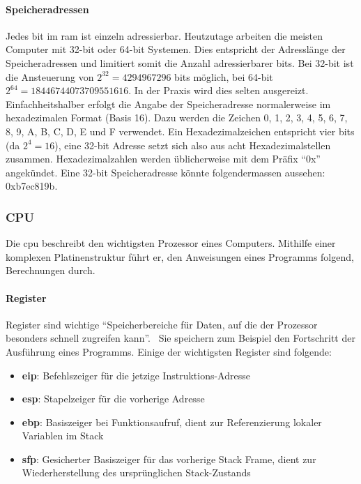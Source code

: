 \documentclass[11pt, a4paper]{article}
\begin{document}
\paragraph{Speicheradressen}
Jedes \gls{bit} im \gls{ram} ist einzeln adressierbar. Heutzutage arbeiten die meisten Computer mit 32-\gls{bit} oder 64-\gls{bit} Systemen. Dies entspricht der Adresslänge der Speicheradressen und limitiert somit die Anzahl adressierbarer \glspl{bit}. Bei 32-\gls{bit} ist die Ansteuerung von \(2^{32} = 4 294 967 296\) \glspl{bit} möglich, bei 64-\gls{bit} \(2^{64} = 18 446 744 073 709 551 616\). In der Praxis wird dies selten ausgereizt. Einfachheitshalber erfolgt die Angabe der Speicheradresse normalerweise im hexadezimalen Format (Basis 16). Dazu werden die Zeichen 0, 1, 2, 3, 4, 5, 6, 7, 8, 9, A, B, C, D, E und F verwendet. Ein Hexadezimalzeichen entspricht vier \glspl{bit} (da \(2^4 = 16\)), eine 32-\gls{bit} Adresse setzt sich also aus acht Hexadezimalstellen zusammen. Hexadezimalzahlen werden üblicherweise mit dem Präfix ``0x'' angekündet. Eine 32-\gls{bit} Speicheradresse könnte folgendermassen aussehen: 0xb7ec819b. \cite{BitWiki31:online}

\subsubsection{CPU}\label{subsubsec:cpu}
Die \gls{cpu} beschreibt den wichtigsten Prozessor eines Computers. Mithilfe einer komplexen Platinenstruktur führt er, den Anweisungen eines Programms folgend, Berechnungen durch. 
\paragraph{Register}
Register sind wichtige ``Speicherbereiche für Daten, auf die der Prozessor besonders schnell zugreifen kann''.~\cite{RegisterWikipedia:online} Sie speichern zum Beispiel den Fortschritt der Ausführung eines Programms. Einige der wichtigsten Register sind folgende:
\begin{itemize}
	\item \textbf{\gls{eip}}: Befehlszeiger für die jetzige Instruktions-Adresse \cite{UsefulRe7:online}
	\item \textbf{\gls{esp}}: Stapelzeiger für die vorherige Adresse \cite{UsefulRe7:online}
	\item \textbf{\gls{ebp}}: Basiszeiger bei Funktionsaufruf, dient zur Referenzierung lokaler Variablen im Stack \cite{UsefulRe7:online}
	\item \textbf{\gls{sfp}}: Gesicherter Basiszeiger für das vorherige Stack Frame, dient zur Wiederherstellung des ursprünglichen Stack-Zustands \cite{UsefulRe7:online}
\end{itemize}
\end{document}

